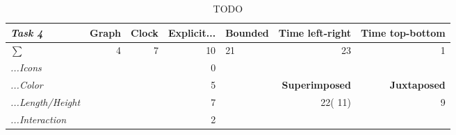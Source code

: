 \begin{table}[]
	\centering
	\begin{tabular}{l|rr|r|lrr}
		\cline{2-7}
		\textit{\textbf{Task 4}} & \multicolumn{1}{l|}{\textbf{Graph}} & \multicolumn{1}{l|}{\textbf{Clock}} & \multicolumn{1}{l|}{\textbf{Explicit...}} & \multicolumn{1}{l|}{\textbf{Bounded}} & \multicolumn{1}{l|}{\textbf{Time left-right}} & \multicolumn{1}{l|}{\textbf{Time top-bottom}} \\ \hline
		\multicolumn{1}{|l|}{\textit{$\sum$}} & \multicolumn{1}{r|}{4} & 7 & 10 & \multicolumn{1}{l|}{21} & \multicolumn{1}{r|}{23} & \multicolumn{1}{r|}{1} \\ \hline
		\multicolumn{1}{|l|}{\textit{...Icons}} &  &  & 0 &  &  &  \\ \cline{1-1} \cline{4-4} \cline{6-7} 
		\multicolumn{1}{|l|}{\textit{...Color}} &  &  & 5 & \multicolumn{1}{l|}{} & \multicolumn{1}{r|}{\textbf{Superimposed}} & \multicolumn{1}{r|}{\textbf{Juxtaposed}} \\ \cline{1-1} \cline{4-4} \cline{6-7} 
		\multicolumn{1}{|l|}{\textit{...Length/Height}} &  &  & 7 & \multicolumn{1}{l|}{} & \multicolumn{1}{r|}{22({\color[HTML]{CB0000}  11})} & \multicolumn{1}{r|}{9} \\ \cline{1-1} \cline{4-4} \cline{6-7} 
		\multicolumn{1}{|l|}{\textit{...Interaction}} &  &  & 2 & \textit{} &  &  \\ \cline{1-1} \cline{4-4}
	\end{tabular}
\caption{TODO}
\label{tb:t4}
\end{table}